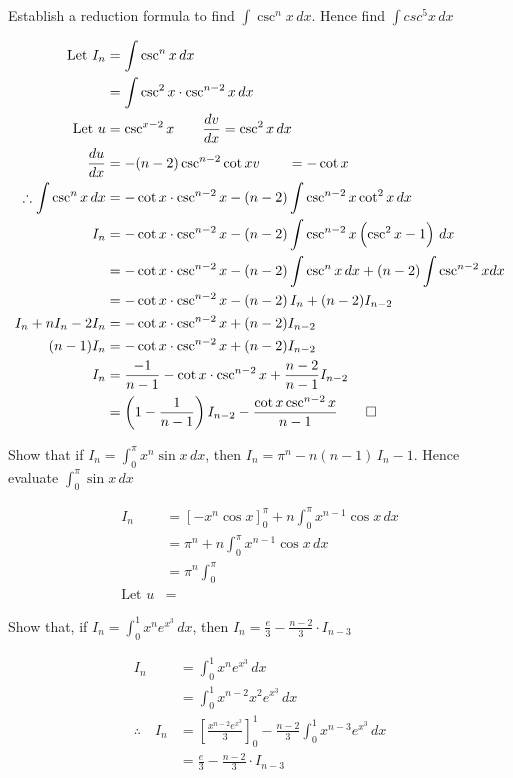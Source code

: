 \documentclass{standalone}
\begin{document}
	\begin{example}
		Establish a reduction formula to find $\int \csc^nx \, dx$. Hence find $\int csc^5x \, dx$
	\end{example}


	\begin{align*}
		\text{Let } I_n &= \int \csc^nx \, dx\\
		&= \int \csc^2x \cdot \csc^{n-2}x \, dx\\
		\text{Let } u & = \csc^{x-2} x              \qquad \frac{dv}{dx} = \csc^2x \, dx \\
		\frac{du}{dx}     & = -(n-2)\csc^{n-2}\cot x  v \qquad = -\cot x                 \\
		\therefore \int \csc^nx \, dx &= -\cot x \cdot \csc^{n-2}x  - (n-2)\int \csc^{n-2}x\cot^2x \, dx\\
		I_n &= 	-\cot x \cdot \csc^{n-2}x - (n-2)\int \csc^{n-2}x\left(\csc^2x - 1\right) \, dx\\
		&= 		-\cot x \cdot \csc^{n-2}x - (n-2)\int \csc^{n}x\,dx + (n-2)\int\csc^{n-2}xdx\\
		&=-\cot x \cdot \csc^{n-2}x  - (n-2)\, I_n + (n-2)I_{n-2}\\
		I_n + nI_n -2I_n &= -\cot x\cdot \csc^{n-2}x  + (n-2)I_{n-2}\\
		(n-1)I_n &= -\cot x\cdot \csc^{n-2}x  + (n-2)I_{n-2}\\
		I_n &= \frac{-1}{n-1}-\cot x\cdot \csc^{n-2}x + \frac{n-2}{n-1}I_{n-2}\\
		&= \left(1-\frac{1}{n-1}\right)I_{n-2}-\frac{\cot x\csc^{n-2}x}{n-1}\qed
	\end{align*}
	\begin{example}
		Show that if $I_n = \int_0^\pi x^n\sin x\,dx$, then $I_n = \pi^n - n(n-1)\,I_n-1$. Hence evaluate $\int_0^\pi\sin x\,dx$
	\end{example}
	\begin{align*}
		I_n &=\left[-x^n\cos x\right]_0^\pi + n\int_0^\pi x^{n-1} \cos x \, dx\\
		&=\pi^n + n\int_0^\pi x^{n-1} \cos x \, dx\\
		&= \pi^n \int_0^\pi \\
		\text {Let } u &=
	\end{align*}
	\begin{example}
		Show that, if $I_n = \int_0^1 x^n e^{x^3} \, dx$, then $I_n = \frac{e}{3} - \frac{n-2}{3} \cdot I_{n-3}$
	\end{example}
	
	\begin{align*}
		I_n &= \int_0^1 x^n e^{x^3} \, dx\\
		&= \int_0^1 x^{n-2}x^2e^{x^3} \, dx\\
		\therefore \quad I_n &= \left[\frac{x^{n-2}e^{x^3}}3\right]_0^1 - \frac{n-2}3 \int_0^1 x^{n-3}{e^{x^3}} \, dx\\
		&= \frac{e}3 - \frac{n-2}3 \cdot I_{n-3}
	\end{align*}
	
\end{document}
